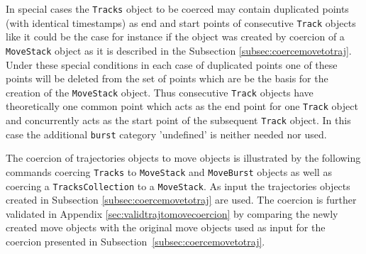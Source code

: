 \documentclass[12pt, oneside, a4paper]{scrbook}
\newcommand{\pkg}[1]{{\normalfont\fontseries{b}\selectfont #1}}
\let\code=\texttt
\begin{document}
In special cases the \code{Tracks} object to be coerced may contain duplicated points (with identical timestamps) as end and start points of consecutive \code{Track} objects like it could be the case for instance if the object was created by coercion of a \code{MoveStack} object as it is described in the Subsection \ref{subsec:coercemovetotraj}.
Under these special conditions in each case of duplicated points one of these points will be deleted from the set of points which are be the basis for the creation of the \code{MoveStack} object.
Thus consecutive \code{Track} objects have theoretically one common point which acts as the end point for one \code{Track} object and concurrently acts as the start point of the subsequent \code{Track} object.
In this case the additional \code{burst} category 'undefined' is neither needed nor used.

\par\medskip

The coercion of \pkg{trajectories} objects to \pkg{move} objects is illustrated by the following commands coercing \code{Tracks} to \code{MoveStack} and \code{MoveBurst} objects as well as coercing a \code{TracksCollection} to a \code{MoveStack}. As input the \pkg{trajectories} objects created in Subsection \ref{subsec:coercemovetotraj} are used. The coercion is further validated in Appendix \ref{sec:validtrajtomovecoercion} by comparing the newly created \pkg{move} objects with the original \pkg{move} objects used as input for the coercion presented in Subsection~\ref{subsec:coercemovetotraj}.
\end{document}
